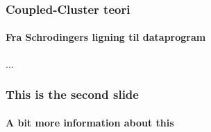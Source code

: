 \documentclass{beamer}
\begin{document}
  \begin{frame}
    \frametitle{Coupled-Cluster teori}
    \framesubtitle{Fra Schrodingers ligning til dataprogram}
    ...
  \end{frame}
  \begin{frame}
    \frametitle{This is the second slide}
    \framesubtitle{A bit more information about this}
  \end{frame}
\end{document}
